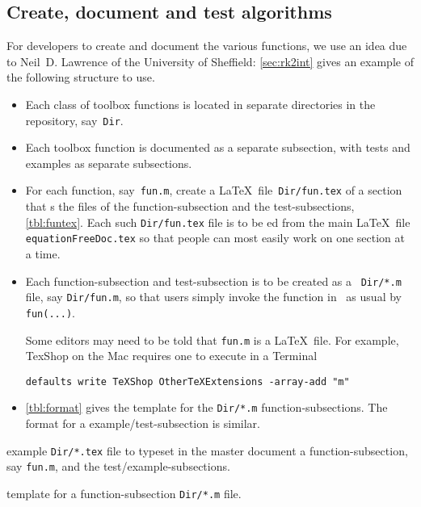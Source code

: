\subsection{Create, document and test algorithms}

For developers to create and document the various functions, we use an idea due to Neil~D. Lawrence of the University of Sheffield:
\autoref{sec:rk2int} gives an example of the following structure to use.

\begin{itemize}
\item Each class of toolbox functions is located in separate directories in the repository, say~\verb|Dir|.

\item Each toolbox function is documented as a separate subsection, with tests and examples as separate subsections.

\item For each function, say~\verb|fun.m|, create a \LaTeX\ file~\verb|Dir/fun.tex| of a section that \verb||s the  files of the function-subsection and the test-subsections, \autoref{tbl:funtex}.
Each such \verb|Dir/fun.tex| file is to be \verb||ed from the main \LaTeX\ file \verb|equationFreeDoc.tex| so that people can most easily work on one section at a time.  

\item Each function-subsection and test-subsection is to be created as a \script\ \verb|Dir/*.m| file, say \verb|Dir/fun.m|, so that users simply invoke the function in \script\ as usual by \verb|fun(...)|.

Some editors may need to be told that \verb|fun.m| is a \LaTeX\ file.  For example, TexShop on the Mac requires one to execute in a Terminal
\begin{verbatim}
defaults write TeXShop OtherTeXExtensions -array-add "m"
\end{verbatim}

\item \autoref{tbl:format} gives the template for the \verb|Dir/*.m| function-subsections.
The format for a example\slash test-subsection is similar.


\end{itemize}

\begin{table}\small
\caption{\label{tbl:funtex}example \texttt{Dir/*.tex} file to typeset in the master document a function-subsection, say \texttt{fun.m}, and the test\slash example-subsections.}

\caption{\label{tbl:format}template for a function-subsection \texttt{Dir/*.m} file.}

\end{table}


